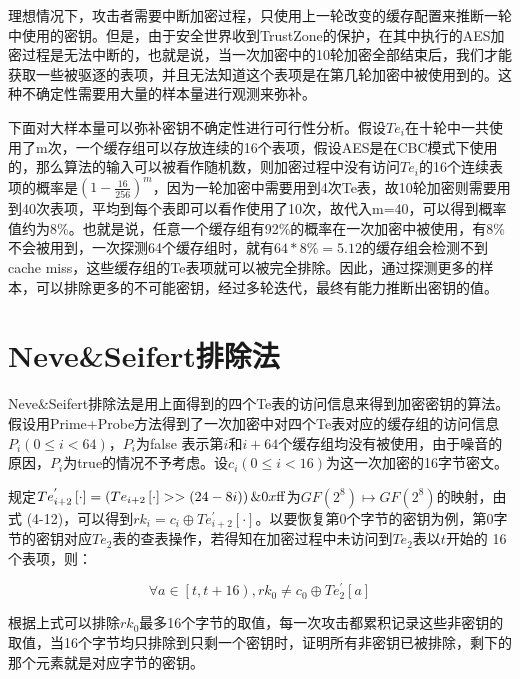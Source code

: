 理想情况下，攻击者需要中断加密过程，只使用上一轮改变的缓存配置来推断一轮中使用的密钥。但是，由于安全世界收到TrustZone的保护，在其中执行的AES加密过程是无法中断的，也就是说，当一次加密中的10轮加密全部结束后，我们才能获取一些被驱逐的表项，并且无法知道这个表项是在第几轮加密中被使用到的。这种不确定性需要用大量的样本量进行观测来弥补。

下面对大样本量可以弥补密钥不确定性进行可行性分析。假设$T{e_i}$在十轮中一共使用了m次，一个缓存组可以存放连续的16个表项，假设AES是在CBC模式下使用的，那么算法的输入可以被看作随机数，则加密过程中没有访问$T{e_i}$的16个连续表项的概率是${\left( {1 - \frac{{16}}{{256}}} \right)^m}$，因为一轮加密中需要用到4次Te表，故10轮加密则需要用到40次表项，平均到每个表即可以看作使用了10次，故代入m=40，可以得到概率值约为8\%。也就是说，任意一个缓存组有92\%的概率在一次加密中被使用，有8\%不会被用到，一次探测64个缓存组时，就有$64*8\%  = 5.12$的缓存组会检测不到cache miss，这些缓存组的Te表项就可以被完全排除。因此，通过探测更多的样本，可以排除更多的不可能密钥，经过多轮迭代，最终有能力推断出密钥的值。

\section{Neve\&Seifert排除法}

Neve\&Seifert排除法\cite{neve2006advances}是用上面得到的四个Te表的访问信息来得到加密密钥的算法。假设用Prime+Probe方法得到了一次加密中对四个Te表对应的缓存组的访问信息${P_i}\left( {0 \le i < 64} \right)$，${P_i}$为false 表示第$i$和$i+64$个缓存组均没有被使用，由于噪音的原因，${P_i}$为true的情况不予考虑。设${c_i}\left( {0 \le i < 16} \right)$为这一次加密的16字节密文。

规定$Te_{i + 2}^{'}\left[  \cdot  \right] = \left( {T{e_{i + 2}}\left[  \cdot  \right] >  > \left( {24 - 8i} \right)} \right)\& 0x{\rm{ff}}$为$GF\left( {{2^8}} \right) \mapsto GF\left( {{2^8}} \right)$的映射，由式 (4-12)，可以得到$r{k_i} = {c_i} \oplus Te_{i + 2}^{'}\left[  \cdot  \right]$。以要恢复第0个字节的密钥为例，第0字节的密钥对应$T{e_2}$表的查表操作，若得知在加密过程中未访问到$T{e_2}$表以$t$开始的 16 个表项，则：

\begin{equation}
	\forall a \in \left[ {t,t + 16} \right),r{k_0} \ne {c_0} \oplus Te_2^{'}\left[ a \right]
\end{equation}

根据上式可以排除$r{k_0}$最多16个字节的取值，每一次攻击都累积记录这些非密钥的取值，当16个字节均只排除到只剩一个密钥时，证明所有非密钥已被排除，剩下的那个元素就是对应字节的密钥。


